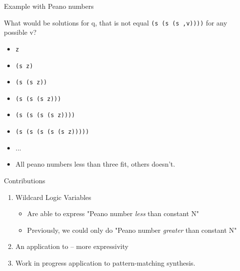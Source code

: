 \documentclass[aspectratio=169
  , xcolor={svgnames}
  , hyperref=
      { colorlinks
      , urlcolor=DarkBlue
      }
  , russian  %
  ]{beamer}
\begin{document}
\begin{frame}{Example with Peano numbers}

What would be solutions for q, that is not equal \texttt{(s (s (s ,v))))} for any possible v?

\begin{itemize}
\item[\faGood] \texttt{z}
\item[\faGood] \texttt{(s z)}
\item[\faGood] \texttt{(s (s z))}
\item[\faBad] \texttt{(s (s (s z)))}
\item[\faBad] \texttt{(s (s (s (s z))))}
\item[\faBad] \texttt{(s (s (s (s (s z)))))}
\item ...
\item All peano numbers less than three fit, others doesn't.
\end{itemize}

\end{frame}
\begin{frame}{Contributions}
\begin{enumerate}


\item Wildcard Logic Variables
\begin{itemize}
\item Are able to express "Peano number \emph{less} than constant N"
\item Previously, we could only do "Peano number \emph{greater} than constant N"
\end{itemize}
\item An application to \noCanren{} -- more expressivity
\item Work in progress application to pattern-matching synthesis.
\end{enumerate}
\end{frame}
\end{document}
